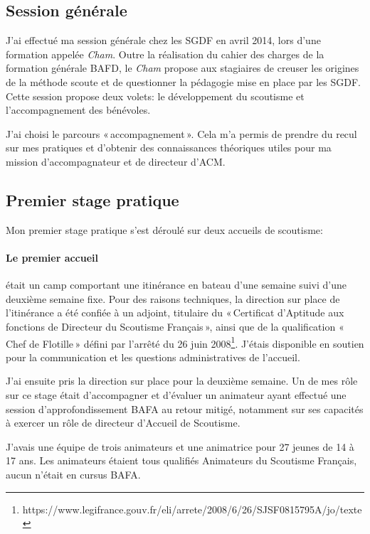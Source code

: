 \documentclass[titlepage,11pt,a4paper]{article}
\begin{document}
\subsection{Session générale}

J'ai effectué ma session générale chez les SGDF en avril 2014, lors d'une formation
appelée \emph{Cham}. Outre la réalisation du cahier des charges de la formation générale BAFD,
le \emph{Cham} propose aux stagiaires de creuser les origines de la méthode scoute et de
questionner la pédagogie mise en place par les SGDF. Cette session propose deux volets: le
développement du scoutisme et l'accompagnement des bénévoles.

J'ai choisi le parcours «\,accompagnement\,». Cela m'a permis de prendre du recul sur mes
pratiques et d'obtenir des connaissances théoriques utiles pour ma mission
d'accompagnateur et de directeur d'ACM.

\subsection{Premier stage pratique}

Mon premier stage pratique s'est déroulé sur deux accueils de scoutisme:

\paragraph{Le premier accueil} était un camp comportant une itinérance en bateau d'une semaine suivi d'une
deuxième semaine fixe. Pour des raisons techniques, la direction sur place de l'itinérance
a été confiée à un adjoint, titulaire du «\,Certificat d'Aptitude aux fonctions de Directeur
du Scoutisme Français\,», ainsi que de la qualification «\,Chef de Flotille\,» défini par
l'arrêté du 26 juin
2008\footnote{https://www.legifrance.gouv.fr/eli/arrete/2008/6/26/SJSF0815795A/jo/texte}.
J'étais disponible en soutien pour la communication et les questions administratives de
l'accueil.

J'ai ensuite pris la direction sur place pour la deuxième semaine. Un de mes rôle sur ce
stage était d'accompagner et d'évaluer un animateur ayant effectué une session
d'approfondissement BAFA au retour mitigé, notamment sur ses capacités à exercer un rôle
de directeur d'Accueil de Scoutisme.

J'avais une équipe de trois animateurs et une animatrice pour 27 jeunes de 14 à 17 ans. Les animateurs
étaient tous qualifiés Animateurs du Scoutisme Français, aucun n'était en cursus BAFA.
\end{document}
